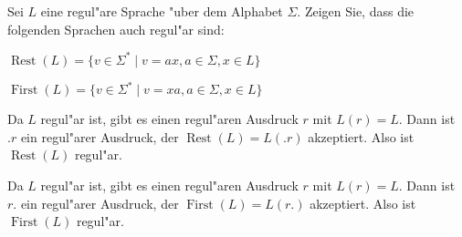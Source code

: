 Sei $L$ eine regul"are Sprache "uber dem Alphabet $\Sigma$.
Zeigen Sie, dass die folgenden Sprachen auch regul"ar sind:
\begin{teilaufgaben}
\item $\operatorname{Rest}(L)=\{v \in\Sigma^*\;|\; v=ax, a\in\Sigma, x\in L\}$
\item $\operatorname{First}(L)=\{v \in\Sigma^*\;|\; v=xa, a\in\Sigma, x\in L\}$
\end{teilaufgaben}

\begin{loesung}
\begin{teilaufgaben}
\item Da $L$ regul"ar ist, gibt es einen regul"aren Ausdruck $r$ mit
$L(r)=L$. Dann ist $.r$ ein regul"arer Ausdruck, der
$\operatorname{Rest}(L)=L(.r)$ akzeptiert.
Also ist
$\operatorname{Rest}(L)$ regul"ar.
\item Da $L$ regul"ar ist, gibt es einen regul"aren Ausdruck $r$ mit
$L(r)=L$. Dann ist $r.$ ein regul"arer Ausdruck, der
$\operatorname{First}(L)=L(r.)$ akzeptiert. Also ist
$\operatorname{First}(L)$ regul"ar.
\end{teilaufgaben}
\end{loesung}

